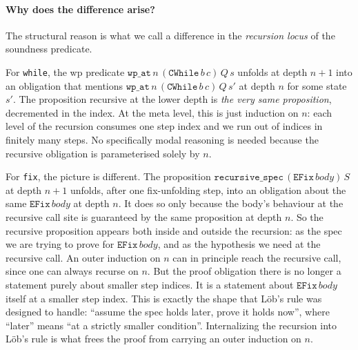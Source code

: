 \paragraph{Why does the difference arise?}
The structural reason is what we call a difference in the
\emph{recursion locus} of the soundness predicate.

For \texttt{while}, the wp predicate
$\mathtt{wp\_at}\, n\, (\mathtt{CWhile}\, b\, c)\, Q\, s$
unfolds at depth $n+1$ into an obligation that mentions
$\mathtt{wp\_at}\, n\, (\mathtt{CWhile}\, b\, c)\, Q\, s'$ at depth
$n$ for some state $s'$.  The proposition recursive at the lower
depth is \emph{the very same proposition}, decremented in the index.
At the meta level, this is just induction on $n$: each level of the
recursion consumes one step index and we run out of indices in
finitely many steps.  No specifically modal reasoning is needed
because the recursive obligation is parameterised solely by $n$.

For \texttt{fix}, the picture is different.  The proposition
$\mathtt{recursive\_spec}\, (\mathtt{EFix}\, body)\, S$ at depth
$n+1$ unfolds, after one fix-unfolding step, into an obligation
about the same $\mathtt{EFix}\, body$ at depth $n$.  It does so only
because the body's behaviour at the recursive call site is guaranteed
by the same proposition at depth $n$.  So the recursive proposition
appears both inside and outside the recursion: as the spec we are
trying to prove for $\mathtt{EFix}\, body$, and as the hypothesis we
need at the recursive call.  An outer induction on $n$ can in
principle reach the recursive call, since one can always recurse on
$n$.  But the proof obligation there is no longer a statement purely
about smaller step indices. It is a statement about
$\mathtt{EFix}\, body$ itself at a smaller step index.  This is
exactly the shape that Löb's rule was designed to handle:
``assume the spec holds later, prove it holds now'', where ``later''
means ``at a strictly smaller condition''.  Internalizing the
recursion into Löb's rule is what frees the proof from carrying an
outer induction on $n$.

